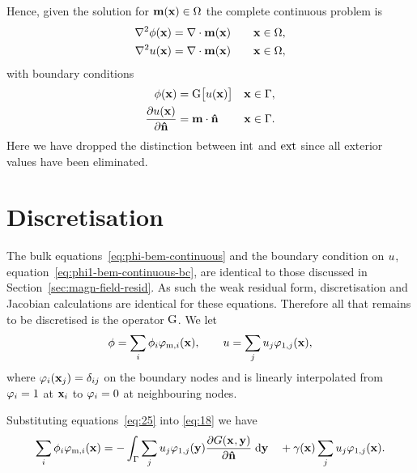 Hence, given the solution for $\mathbf{m}(\mathbf{x}) \in \Omega$ the complete continuous problem is
 \begin{subequations}
   \label{eq:phi-bem-continuous}
   \begin{align}
     \label{eq:phim-bem-continuous}
     \nabla^2 \phi(\mathbf{x}) &= \nabla \cdot \mathbf{m}(\mathbf{x}) \quad & \mathbf{x} \in \Omega, \\
     \label{eq:phi1-bem-continuous}
     \nabla^2 u(\mathbf{x}) &= \nabla \cdot \mathbf{m}(\mathbf{x})    & \mathbf{x} \in \Omega,
   \end{align}
 \end{subequations}
with boundary conditions
 \begin{subequations}
   \label{eq:phi-bem-continuous-bc}
   \begin{align}
     \label{eq:phim-bem-continuous-bc}
     \phi(\mathbf{x}) &= {\mathbf{\mathrm{G}}} \big[ u(\mathbf{x}) \big]      & \mathbf{x} \in {\Gamma}, \\
     \label{eq:phi1-bem-continuous-bc}
       \frac{\partial u(\mathbf{x})}{\partial \mathbf{\hat{n}}} &= \mathbf{m} \cdot \mathbf{\hat{n}}  & \mathbf{x} \in {\Gamma}.
   \end{align}
 \end{subequations}
Here we have dropped the distinction between $\text{int}$ and $\text{ext}$ since all exterior values have been eliminated.


\section{Discretisation}
\label{sec:discretisation}

The bulk equations~\eqref{eq:phi-bem-continuous} and the boundary condition on $u$, equation~\eqref{eq:phi1-bem-continuous-bc}, are identical to those discussed in Section~\ref{sec:magn-field-resid}.
As such the weak residual form, discretisation and Jacobian calculations are identical for these equations.
Therefore all that remains to be discretised is the operator ${\mathbf{\mathrm{G}}}$. We let
\begin{equation}
  \phi = \sum_{i} \phi_{{i}} \varphi_{\text{m},{i}}(\mathbf{x}),
  \qquad
  u = \sum_{j} u_{{j}} \varphi_{1,{j}}(\mathbf{x}),
  \label{eq:25}
\end{equation}
where $\varphi_{i}(\mathbf{x}_{j}) = \delta_{{i} {j}}$ on the boundary nodes and is linearly interpolated from $\varphi_{i} = 1$ at $\mathbf{x}_{i}$ to $\varphi_{i} = 0$ at neighbouring nodes.

Substituting equations~\eqref{eq:25} into \eqref{eq:18} we have
\begin{equation*}
  \sum_{i} \phi_{{i}} \varphi_{\text{m},{i}}(\mathbf{x}) =
  - \int_{{\Gamma}} \sum_{j} u_{{j}} \varphi_{1,{j}}(\mathbf{y})
  \frac{\partial G(\mathbf{x}_{},\mathbf{y})}{\partial \mathbf{\hat{n}}} {\; \text{d}} \mathbf{y}
  \quad + \gamma(\mathbf{x}) \sum_{j} u_{{j}} \varphi_{1,{j}}(\mathbf{x}).
\end{equation*}

